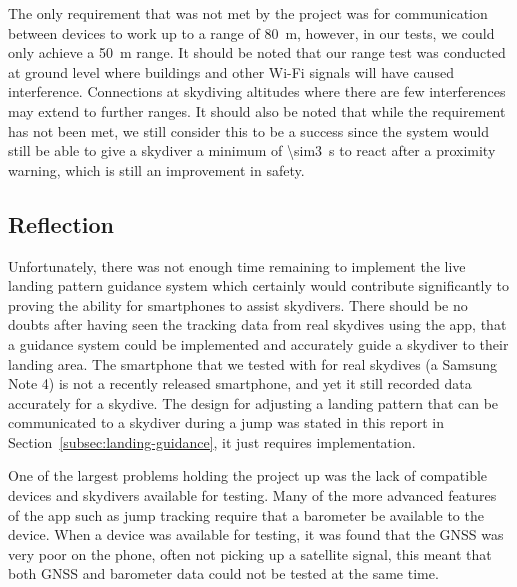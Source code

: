 The only requirement that was not met by the project was for communication between devices to work up to a range of \SI{80}{\metre}, however, in our tests, we could only achieve a \SI{50}{\metre} range. It should be noted that our range test was conducted at ground level where buildings and other Wi-Fi signals will have caused interference. Connections at skydiving altitudes where there are few interferences may extend to further ranges. It should also be noted that while the requirement has not been met, we still consider this to be a success since the system would still be able to give a skydiver a minimum of \SI{\sim3}{\second} to react after a proximity warning, which is still an improvement in safety.

\subsection{Reflection}
Unfortunately, there was not enough time remaining to implement the live landing pattern guidance system which certainly would contribute significantly to proving the ability for smartphones to assist skydivers. There should be no doubts after having seen the tracking data from real skydives using the app, that a guidance system could be implemented and accurately guide a skydiver to their landing area. The smartphone that we tested with for real skydives (a Samsung Note 4) is not a recently released smartphone, and yet it still recorded data accurately for a skydive. The design for adjusting a landing pattern that can be communicated to a skydiver during a jump was stated in this report in Section~\ref{subsec:landing-guidance}, it just requires implementation.

One of the largest problems holding the project up was the lack of compatible devices and skydivers available for testing. Many of the more advanced features of the app such as jump tracking require that a barometer be available to the device. When a device was available for testing, it was found that the GNSS was very poor on the phone, often not picking up a satellite signal, this meant that both GNSS and barometer data could not be tested at the same time.

